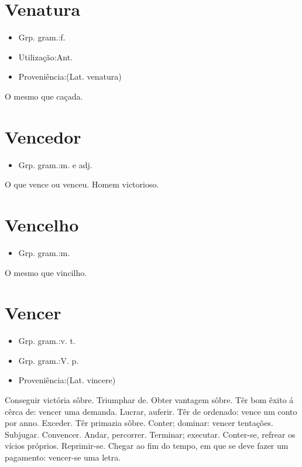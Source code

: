 \documentclass{article}
\begin{document}
\section{Venatura}
\begin{itemize}
\item {Grp. gram.:f.}
\end{itemize}
\begin{itemize}
\item {Utilização:Ant.}
\end{itemize}
\begin{itemize}
\item {Proveniência:(Lat. \textunderscore venatura\textunderscore )}
\end{itemize}
O mesmo que \textunderscore caçada\textunderscore .
\section{Vencedor}
\begin{itemize}
\item {Grp. gram.:m.  e  adj.}
\end{itemize}
O que vence ou venceu.
Homem victorioso.
\section{Vencelho}
\begin{itemize}
\item {Grp. gram.:m.}
\end{itemize}
O mesmo que \textunderscore vincilho\textunderscore .
\section{Vencer}
\begin{itemize}
\item {Grp. gram.:v. t.}
\end{itemize}
\begin{itemize}
\item {Grp. gram.:V. p.}
\end{itemize}
\begin{itemize}
\item {Proveniência:(Lat. \textunderscore vincere\textunderscore )}
\end{itemize}
Conseguir victória sôbre.
Triumphar de.
Obter vantagem sôbre.
Têr bom êxito á cêrca de: \textunderscore vencer uma demanda\textunderscore .
Lucrar, auferir.
Têr de ordenado: \textunderscore vence um conto por anno\textunderscore .
Exceder.
Têr primazia sôbre.
Conter; dominar: \textunderscore vencer tentações\textunderscore .
Subjugar.
Convencer.
Andar, percorrer.
Terminar; executar.
Conter-se, refrear os vícios próprios.
Reprimir-se.
Chegar ao fim do tempo, em que se deve fazer um pagamento: \textunderscore vencer-se uma letra\textunderscore .
\end{document}
